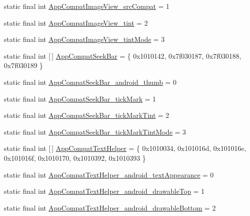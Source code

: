 \begin{DoxyCompactItemize}
static final int \mbox{\hyperlink{classcom_1_1synnapps_1_1carouselview_1_1_r_1_1styleable_a20989993fe32e183759220647f5769d5}{App\+Compat\+Image\+View\+\_\+src\+Compat}} = 1
\item 
static final int \mbox{\hyperlink{classcom_1_1synnapps_1_1carouselview_1_1_r_1_1styleable_a6618dd80c7b75e54af0e6137255c98b6}{App\+Compat\+Image\+View\+\_\+tint}} = 2
\item 
static final int \mbox{\hyperlink{classcom_1_1synnapps_1_1carouselview_1_1_r_1_1styleable_a168a9f6a4c0dbb9b7f32db2fd49c88b7}{App\+Compat\+Image\+View\+\_\+tint\+Mode}} = 3
\item 
static final int \mbox{[}$\,$\mbox{]} \mbox{\hyperlink{classcom_1_1synnapps_1_1carouselview_1_1_r_1_1styleable_a9ea96cd629f753726cc02f561ec08612}{App\+Compat\+Seek\+Bar}} = \{ 0x1010142, 0x7f030187, 0x7f030188, 0x7f030189 \}
\item 
static final int \mbox{\hyperlink{classcom_1_1synnapps_1_1carouselview_1_1_r_1_1styleable_a574d6b8ff11308fb5036d523d3c99c3f}{App\+Compat\+Seek\+Bar\+\_\+android\+\_\+thumb}} = 0
\item 
static final int \mbox{\hyperlink{classcom_1_1synnapps_1_1carouselview_1_1_r_1_1styleable_af6431852a543493085056aaf3b4c2689}{App\+Compat\+Seek\+Bar\+\_\+tick\+Mark}} = 1
\item 
static final int \mbox{\hyperlink{classcom_1_1synnapps_1_1carouselview_1_1_r_1_1styleable_a17e0e6e6be8f814976c3b24e15572f30}{App\+Compat\+Seek\+Bar\+\_\+tick\+Mark\+Tint}} = 2
\item 
static final int \mbox{\hyperlink{classcom_1_1synnapps_1_1carouselview_1_1_r_1_1styleable_a4fd114870464bd67b6029e621ce5e1be}{App\+Compat\+Seek\+Bar\+\_\+tick\+Mark\+Tint\+Mode}} = 3
\item 
static final int \mbox{[}$\,$\mbox{]} \mbox{\hyperlink{classcom_1_1synnapps_1_1carouselview_1_1_r_1_1styleable_a1b3a8df80011038d87c42e86ac263b51}{App\+Compat\+Text\+Helper}} = \{ 0x1010034, 0x101016d, 0x101016e, 0x101016f, 0x1010170, 0x1010392, 0x1010393 \}
\item 
static final int \mbox{\hyperlink{classcom_1_1synnapps_1_1carouselview_1_1_r_1_1styleable_a51cb1664947eab8bd5b96c19834cf07c}{App\+Compat\+Text\+Helper\+\_\+android\+\_\+text\+Appearance}} = 0
\item 
static final int \mbox{\hyperlink{classcom_1_1synnapps_1_1carouselview_1_1_r_1_1styleable_a23dee1fc2280d7cc91b1260a653837f5}{App\+Compat\+Text\+Helper\+\_\+android\+\_\+drawable\+Top}} = 1
\item 
static final int \mbox{\hyperlink{classcom_1_1synnapps_1_1carouselview_1_1_r_1_1styleable_a107d3dac4ed30d5fbafbb50cf8b93435}{App\+Compat\+Text\+Helper\+\_\+android\+\_\+drawable\+Bottom}} = 2

\end{DoxyCompactItemize}
